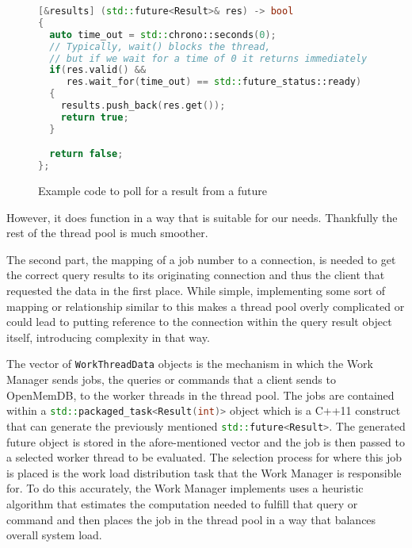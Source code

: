 \documentclass[letterpaper, 11pt]{article}
\newcommand{\inlinecode}[1]{\colorbox{codegrey}{\lstinline[language=C++]{#1}}}
\begin{document}
  \begin{figure}[H]
  \begin{lstlisting}[language=C++]
[&results] (std::future<Result>& res) -> bool
{
  auto time_out = std::chrono::seconds(0);
  // Typically, wait() blocks the thread,
  // but if we wait for a time of 0 it returns immediately
  if(res.valid() &&
     res.wait_for(time_out) == std::future_status::ready)
  {
    results.push_back(res.get());
    return true;
  }

  return false;
};
  \end{lstlisting}
  
  \caption{Example code to poll for a result from a future}
  \label{code:clunk_future}
  \end{figure}
  
  However, it does function in a way that is suitable for our needs. Thankfully the rest of the thread
  pool is much smoother.
  \par\vspace{\baselineskip}
  The second part, the mapping of a job number to a connection, is needed to get the correct query results
  to its originating connection and thus the client that requested the data in the first place. While simple,
  implementing some sort of mapping or relationship similar to this makes a thread pool overly complicated
  or could lead to putting reference to the connection within the query result object itself, introducing
  complexity in that way.
  \par\vspace{\baselineskip}
  The vector of \inlinecode{WorkThreadData} objects is the mechanism in
  which the Work Manager sends jobs, the queries or commands that a client sends to OpenMemDB, to the
  worker threads in the thread pool. The jobs are contained within a \inlinecode{std::packaged_task<Result(int)>}
  object which is a C++11 construct that can generate the previously mentioned \inlinecode{std::future<Result>}.
  The generated future object is stored in the afore-mentioned vector and the job is then passed to a selected
  worker thread to be evaluated. The selection process for where this job is placed is the work load distribution
  task that the Work Manager is responsible for. To do this accurately, the Work Manager implements
  uses a heuristic algorithm that estimates the computation needed to fulfill that query or command
  and then places the job in the thread pool in a way that balances overall system load.
  \par\vspace{\baselineskip}
\end{document}
